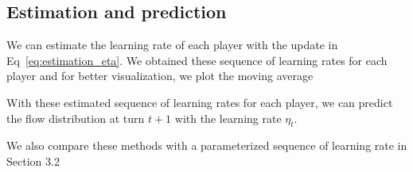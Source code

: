 \documentclass{sig-alternate-ipsn13}
\begin{document}
\subsection{Estimation and prediction}

We can estimate the learning rate of each player with the update in Eq~\ref{eq:estimation_eta}. We obtained these sequence of learning rates for each player and for better visualization, we plot the moving average


With these estimated sequence of learning rates for each player, we can predict the flow distribution at turn $t+1$ with the learning rate $\eta_t$.

We also compare these methods with a parameterized sequence of learning rate in Section 3.2






\end{document}
